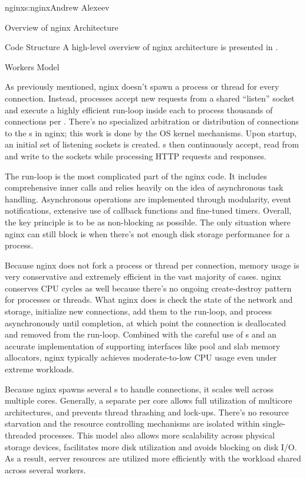 \begin{aosachapter}{nginx}{s:nginx}{Andrew Alexeev}
\begin{aosasect1}{Overview of nginx Architecture}
\begin{aosasect2}{Code Structure}
A high-level overview of nginx architecture is presented in
.


\end{aosasect2}

\begin{aosasect2}{Workers Model}

As previously mentioned, nginx doesn't spawn a process or thread for
every connection. Instead,  processes accept new requests
from a shared ``listen'' socket and execute a highly efficient
run-loop inside each  to process thousands of connections
per . There's no specialized arbitration or distribution of
connections to the s in nginx; this work is done by the OS 
kernel mechanisms. Upon startup, an initial set of
listening sockets is created. s then continuously accept,
read from and write to the sockets while processing HTTP requests and
responses.

The run-loop is the most complicated part of the nginx 
code. It includes comprehensive inner calls and relies heavily on the
idea of asynchronous task handling. Asynchronous operations are
implemented through modularity, event notifications, extensive use of
callback functions and fine-tuned timers. Overall, the key principle
is to be as non-blocking as possible. The only situation where nginx
can still block is when there's not enough disk storage performance
for a  process.

Because nginx does not fork a process or thread per connection, memory
usage is very conservative and extremely efficient in the vast
majority of cases. nginx conserves CPU cycles as well because there's
no ongoing create-destroy pattern for processes or threads. What nginx
does is check the state of the network and storage, initialize new
connections, add them to the run-loop, and process asynchronously
until completion, at which point the connection is deallocated and
removed from the run-loop. Combined with the careful use of
s and an accurate implementation of supporting
interfaces like pool and slab memory allocators, nginx typically
achieves moderate-to-low CPU usage even under extreme workloads.

Because nginx spawns several s to handle connections, it
scales well across multiple cores. Generally, a separate 
per core allows full utilization of multicore architectures, and
prevents thread thrashing and lock-ups. There's no resource starvation
and the resource controlling mechanisms are isolated within
single-threaded  processes. This model also allows more
scalability across physical storage devices, facilitates more disk
utilization and avoids blocking on disk I/O. As a result, server
resources are utilized more efficiently with the workload shared
across several workers.


\end{aosasect2}
\end{aosasect1}
\end{aosachapter}
